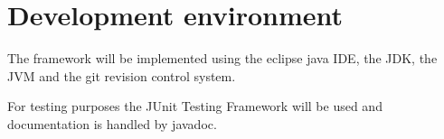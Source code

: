 \section{Development environment}

The framework will be implemented using the \Gls{eclipse} \gls{java} \gls{IDE}, the \Gls{JDK}, the \Gls{JVM} and the \Gls{git} revision control system.\par
For testing purposes the JUnit Testing Framework will be used and documentation is handled by \Gls{javadoc}.\par
